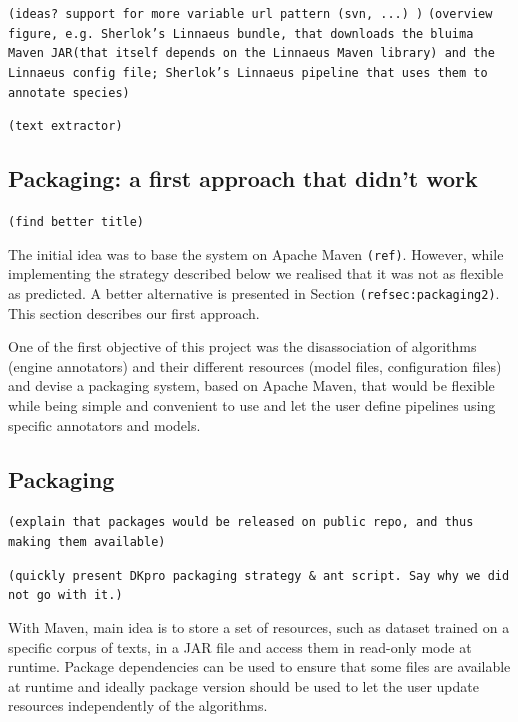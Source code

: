 \documentclass{article}
\newcommand{\JAR}{JAR\xspace}
\newcommand{\TODO}[1]{\texttt{\textcolor{YellowOrange}{(#1)}}} %
\begin{document}
\TODO{ideas? support for more variable url pattern (svn, ...) }
\TODO{overview figure, e.g.  Sherlok's Linnaeus bundle, that downloads the bluima Maven \JAR (that itself depends on the Linnaeus Maven library) and the Linnaeus config file; Sherlok's Linnaeus pipeline that uses them to annotate species}

\TODO{text extractor}



\begin{appendices}

\section{Packaging: a first approach that didn't work}
\label{sec:packaging1}

\TODO{find better title}

The initial idea was to base the system on Apache Maven \TODO{ref}. However, while implementing the
strategy described below we realised that it was not as flexible as predicted. A better alternative
is presented in Section \TODO{ref{sec:packaging2}}. This section describes our first approach.

One of the first objective of this project was the disassociation of algorithms (engine annotators) and their different resources (model files, configuration files) and devise a packaging system, based on Apache Maven, that would be flexible while being simple and convenient to use and let the user define pipelines using specific annotators and models.

\subsection{Packaging}

\TODO{explain that packages would be released on public repo, and thus making them available}

\TODO{quickly present DKpro packaging strategy \& ant script. Say why we did not go with it.}

With Maven, main idea is to store a set of resources, such as dataset trained on a specific corpus of texts, in a \JAR file and access them in read-only mode at runtime. Package dependencies can be used to ensure that some files are available at runtime and ideally package version should be used to let the user update resources independently of the algorithms.


\end{appendices}
\end{document}
